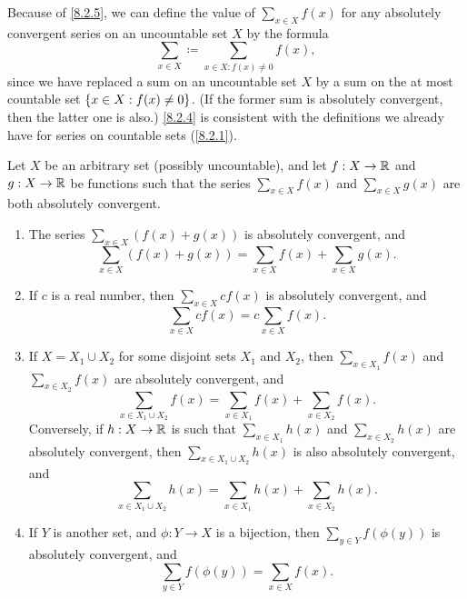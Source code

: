 \begin{note}
  Because of \cref{8.2.5}, we can define the value of \(\sum_{x \in X} f(x)\) for any absolutely convergent series on an uncountable set \(X\) by the formula
  \[
    \sum_{x \in X} \coloneqq \sum_{x \in X : f(x) \neq 0} f(x),
  \]
  since we have replaced a sum on an uncountable set \(X\) by a sum on the at most countable set \(\left\lbrace x \in X : f(x) \neq 0\right\rbrace\).
  (If the former sum is absolutely convergent, then the latter one is also.)
  \cref{8.2.4} is consistent with the definitions we already have for series on countable sets (\cref{8.2.1}).
\end{note}

\begin{prop}\label{8.2.6}
  Let \(X\) be an arbitrary set (possibly uncountable), and let \(f : X \to \mathbb{R}\) and \(g : X \to \mathbb{R}\) be functions such that the series \(\sum_{x \in X} f(x)\) and \(\sum_{x \in X} g(x)\) are both absolutely convergent.
  \begin{enumerate}
    \item The series \(\sum_{x \in X} (f(x) + g(x))\) is absolutely convergent, and
          \[
            \sum_{x \in X} (f(x) + g(x)) = \sum_{x \in X} f(x) + \sum_{x \in X} g(x).
          \]
    \item If \(c\) is a real number, then \(\sum_{x \in X} cf(x)\) is absolutely convergent, and
          \[
            \sum_{x \in X} cf(x) = c \sum_{x \in X} f(x).
          \]
    \item If \(X = X_1 \cup X_2\) for some disjoint sets \(X_1\) and \(X_2\), then \(\sum_{x \in X_1} f(x)\) and \\
          \(\sum_{x \in X_2} f(x)\) are absolutely convergent, and
          \[
            \sum_{x \in X_1 \cup X_2} f(x) = \sum_{x \in X_1} f(x) + \sum_{x \in X_2} f(x).
          \]
          Conversely, if \(h : X \to \mathbb{R}\) is such that \(\sum_{x \in X_1} h(x)\) and \(\sum_{x \in X_2} h(x)\) are absolutely convergent, then \(\sum_{x \in X_1 \cup X_2} h(x)\) is also absolutely convergent, and
          \[
            \sum_{x \in X_1 \cup X_2} h(x) = \sum_{x \in X_1} h(x) + \sum_{x \in X_2} h(x).
          \]
    \item If \(Y\) is another set, and \(\phi : Y \to X\) is a bijection, then \(\sum_{y \in Y} f(\phi(y))\) is absolutely convergent, and
          \[
            \sum_{y \in Y} f(\phi(y)) = \sum_{x \in X} f(x).
          \]
  \end{enumerate}
\end{prop}

